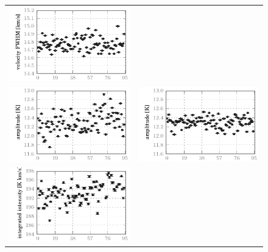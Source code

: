 \begin{figure}[p]
\begin{tabular}{@{}c@{}c@{}}
            \includegraphics{spread_87_outf_vfwh_noisy}    \\
            \includegraphics{spread_87_outf_ampl_corrected}&
            \includegraphics{spread_87_outf_ampl_noisy}    \\
            \includegraphics{spread_87_outf_iint_corrected}&

\end{tabular}
\end{figure}

